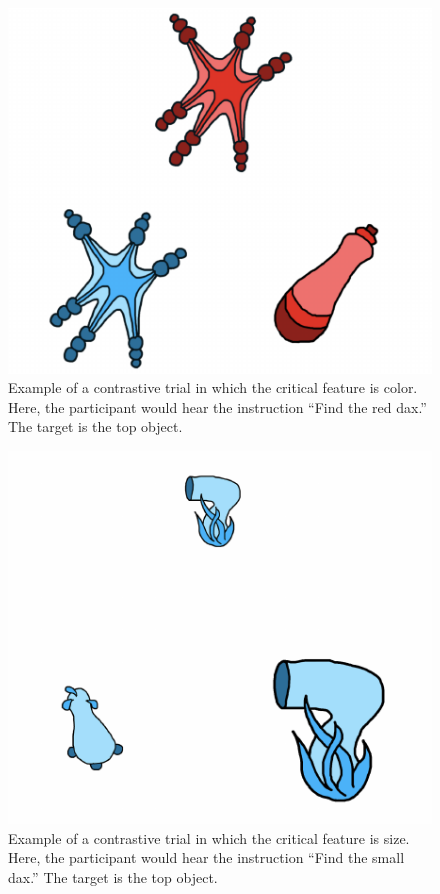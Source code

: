 \documentclass[10pt, letterpaper]{article}
\newenvironment{CodeChunk}{}{}
\begin{document}
\begin{CodeChunk}
\begin{figure}[H]

{\centering \includegraphics{figs/colortrial-1} 

}

\caption[Example of a contrastive trial in which the critical feature is color]{Example of a contrastive trial in which the critical feature is color. Here, the participant would hear the instruction ``Find the red dax.'' The target is the top object.}\label{fig:colortrial}
\end{figure}
\end{CodeChunk}\begin{CodeChunk}
\begin{figure}[H]

{\centering \includegraphics{figs/sizetrial-1} 

}

\caption[Example of a contrastive trial in which the critical feature is size]{Example of a contrastive trial in which the critical feature is size. Here, the participant would hear the instruction ``Find the small dax.'' The target is the top object.}\label{fig:sizetrial}
\end{figure}
\end{CodeChunk}
\end{document}
